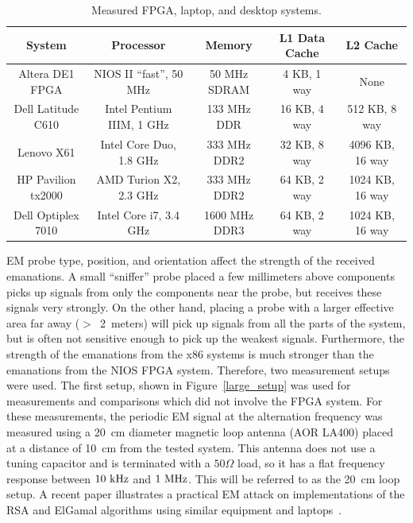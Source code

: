 \begin{table}[tb]%
  \scriptsize%
  \centering%
    \begin{tabular}{ccccc}%
    \toprule
    \textbf{System} & \textbf{Processor} & \textbf{Memory} & \textbf{L1 Data Cache} & \textbf{L2 Cache} \\
    \midrule
    Altera DE1 FPGA      & NIOS II ``fast'', 50 MHz  & 50 MHz SDRAM  & 4 KB, 1 way & None \\
    Dell Latitude C610   & Intel Pentium IIIM, 1 GHz  & 133 MHz DDR   & 16 KB, 4 way & 512 KB, 8 way \\
    Lenovo X61           & Intel Core Duo, 1.8 GHz & 333 MHz DDR2  & 32 KB, 8 way & 4096 KB, 16 way \\
    HP Pavilion tx2000   & AMD Turion X2, 2.3 GHz & 333 MHz DDR2  & 64 KB, 2 way & 1024 KB, 16 way \\
    Dell Optiplex 7010   & Intel Core i7, 3.4 GHz & 1600 MHz DDR3 & 64 KB, 2 way & 1024 KB, 16 way \\
    \bottomrule
    \end{tabular}%
  \caption{Measured FPGA, laptop, and desktop systems.}%
  \label{pc_specs}%
\end{table}%


EM probe type, position, and orientation affect the strength of the received emanations. A small ``sniffer'' probe placed a few millimeters above components picks up signals from only the components near the probe, but receives these signals very strongly. On the other hand, placing a probe with a larger effective area far away ($>$~2~meters) will pick up signals from all the parts of the system, but is often not sensitive enough to pick up the weakest signals. Furthermore, the strength of the emanations from the x86 systems is much stronger than the emanations from the NIOS FPGA system. Therefore, two measurement setups were used. The first setup, shown in Figure~\ref{large_setup} was used for measurements and comparisons which did not involve the FPGA system. For these measurements, the periodic EM signal at the alternation frequency was measured using a 20~cm diameter magnetic loop antenna (AOR LA400) placed at a distance of 10~cm from the tested system. This antenna does not use a tuning capacitor and is terminated with a $50\Omega$ load, so it has a flat frequency response between $10~{\rm kHz}$ and $1~{\rm MHz}$. This will be referred to as the 20~cm loop setup. A recent paper illustrates a practical EM attack on implementations of the RSA and ElGamal algorithms using similar equipment and laptops~\cite{genkin_2014}. 

